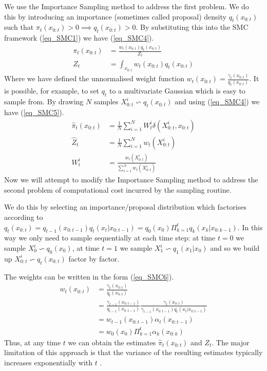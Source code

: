 We use the Importance Sampling method to address the first problem. We do this by introducing an importance (sometimes called proposal) density $q_t(x_{0:t})$ such that $\pi_t(x_{0:t}) > 0 \implies q_t(x_{0:t}) > 0$. By substituting this into the SMC framework (\ref{eq_SMC1}) we have (\ref{eq_SMC4}).
\begin{equation}
\begin{aligned}
\pi_t(x_{0:t}) &= \frac{w_t(x_{0:t})q_t(x_{0:t})}{Z_t} \\
Z_t &= \int_{x_{0:t}} w_t(x_{0:t})q_t(x_{0:t})
\end{aligned}
\label{eq_SMC4}
\end{equation} 
Where we have defined the unnormalised weight function $w_t(x_{0:t}) = \frac{\gamma_t(x_{0:t})}{q_t(x_{0:t})}$. It is possible, for example, to set $q_t$ to a multivariate Gaussian which is easy to sample from. By drawing $N$ samples $X_{0:t}^i \backsim q_t(x_{0:t})$ and using (\ref{eq_SMC4}) we have (\ref{eq_SMC5}). 
\begin{equation}
\begin{aligned}
\hat{\pi}_t(x_{0:t}) &= \frac{1}{N}\sum_{i=1}^N W_t^i\delta(X^i_{0:t}, x_{0:t}) \\
\hat{Z}_t &= \frac{1}{N}\sum_{i=1}^N w_t(X^i_{0:t}) \\
W^i_t &= \frac{w_t(X^i_{0:t})}{\sum_{i=1}^N w_t(X^i_{0:t})}
\end{aligned}
\label{eq_SMC5}
\end{equation}
Now we will attempt to modify the Importance Sampling method to address the second problem of computational cost incurred by the sampling routine. 

We do this by selecting an importance/proposal distribution which factorises according to $q_t(x_{0:t}) = q_{t-1}(x_{0:t-1})q_t(x_{t}|x_{0:t-1}) = q_0(x_0) \Pi_{k=1}^t q_k(x_k|x_{0:k-1})$. In this way we only need to sample sequentially at each time step: at time $t=0$ we sample $X_0^i \backsim q_0(x_0)$, at time $t=1$ we sample $X_{1}^i \backsim q_1(x_1|x_0)$ and so we build up $X^i_{0:t} \backsim q_t(x_{0:t})$ factor by factor.

The weights can be written in the form (\ref{eq_SMC6}).
\begin{equation}
\begin{aligned}
w_t(x_{0:t}) &= \frac{\gamma_t(x_{0:t})}{q_t(x_{0:t})} \\
&= \frac{\gamma_{t-1}(x_{0:t-1})}{q_{t-1}(x_{0:t-1})}\frac{\gamma_t(x_{0:t})}{\gamma_{t-1}(x_{0:t-1})q_t(x_t|x_{0:t-1})} \\
&= w_{t-1}(x_{0:t-1})\alpha_t(x_{0:t-1}) \\
&= w_0(x_0)\Pi_{k=1}^t \alpha_k(x_{0:k})
\end{aligned}
\label{eq_SMC6}
\end{equation}
Thus, at any time $t$ we can obtain the estimates $\hat{\pi}_t(x_{0:t})$ and $Z_t$. The major limitation of this approach is that the variance of the resulting estimates typically increases exponentially with $t$ \cite{pftut}. 

